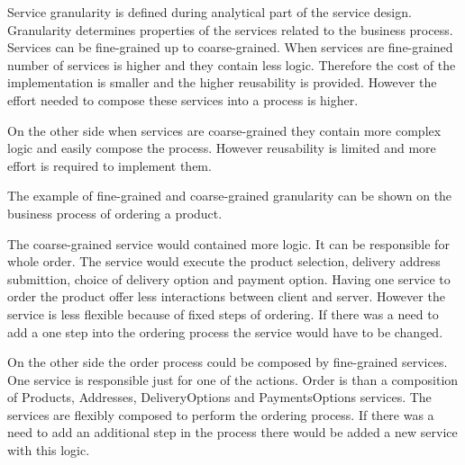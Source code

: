 Service granularity is defined during analytical part of the service design. Granularity determines properties of the services related to the business process. Services can be fine-grained up to coarse-grained. When services are fine-grained number of services is higher and they contain less logic. Therefore the cost of the implementation is smaller and the higher reusability is provided. However the effort needed to compose these services into a process is higher. 

On the other side when services are coarse-grained they contain more complex logic and easily compose the process. However reusability is limited and more effort is required to implement them.

The example of fine-grained and coarse-grained granularity can be shown on the business process of ordering a product.

The coarse-grained service would contained more logic. It can be responsible for whole order. The service would execute the product selection, delivery address submittion, choice of delivery option and payment option. Having one service to order the product offer less interactions between client and server. However the service is less flexible because of fixed steps of ordering. If there was a need to add a one step into the ordering process the service would have to be changed.

On the other side the order process could be composed by fine-grained services. One service is responsible just for one of the actions. Order is than a composition of Products, Addresses, DeliveryOptions and PaymentsOptions services. The services are flexibly composed to perform the ordering process. If there was a need to add an additional step in the process there would be added a new service with this logic.





    
